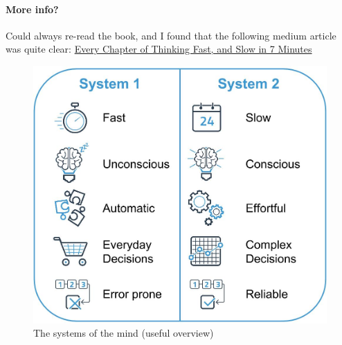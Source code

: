 \paragraph{More info?}
Could always re-read the book, and I found that the following medium article was quite clear: \href{https://medium.com/swlh/every-chapter-of-thinking-fast-and-slow-in-7-minutes-5e6adf89cf39}{Every Chapter of Thinking Fast, and Slow in 7 Minutes}
\begin{figure}
\includegraphics[scale=0.5]{summaries/thinking-fast-and-slow-systems.png}
\caption{The systems of the mind (useful overview)}
\end{figure}